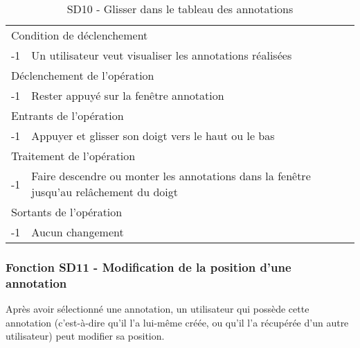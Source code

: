 \documentclass[a4paper]{article}
\begin{document}
\begin{table}[H]
  \centering
   \small
	\begin{tabular}{|c|p{12cm}|}
   		\hline
   			\rowcolor{lightgray}\multicolumn{2}{|c|}{\textbf{SD10 - Glisser dans le tableau des annotations}} \\
   		\hline
   			\multicolumn{2}{|l|}{Condition de d\'eclenchement} \\
   		\hline
   			-1 & Un utilisateur veut visualiser les annotations réalisées\\
   		\hline
   			\multicolumn{2}{|l|}{D\'eclenchement de l'op\'eration} \\
   		\hline
   			-1 & Rester appuyé sur la fenêtre annotation\\
   		\hline
   			\multicolumn{2}{|l|}{Entrants de l'op\'eration} \\
   		\hline
   			-1 & Appuyer et glisser son doigt vers le haut ou le bas\\
   		\hline
   			\multicolumn{2}{|l|}{Traitement de l'op\'eration} \\
  		\hline
   			-1 & Faire descendre ou monter les annotations dans la fenêtre jusqu’au relâchement du doigt\\
   		\hline
   			\multicolumn{2}{|l|}{Sortants de l'op\'eration} \\
   		\hline
   			-1 & Aucun changement\\
   		\hline
	\end{tabular}
  \caption{SD10 - Glisser dans le tableau des annotations}
  \normalsize
  \label{tab:glisser_tab_annotation}
\end{table}

\subsubsection{Fonction SD11 - Modification de la position d’une annotation}
Après avoir sélectionné une annotation, un utilisateur qui possède cette annotation (c’est-à-dire qu’il l’a lui-même créée, ou qu’il l’a récupérée d’un autre utilisateur) peut modifier sa position.\\
\end{document}
